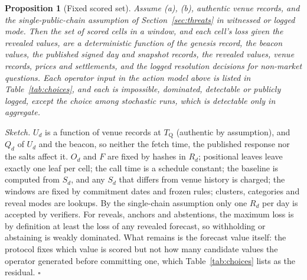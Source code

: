 \documentclass[11pt]{article}
\newtheorem{proposition}{Proposition}
\newcommand{\tQ}{T_{\mathrm{Q}}}
\begin{document}
\begin{proposition}[Fixed scored set]
\label{prop:set}
Assume (a), (b), authentic venue records, and the single-public-chain assumption of Section~\ref{sec:threats} in witnessed or logged mode. Then the set of scored cells in a window, and each cell's loss given the revealed values, are a deterministic function of the genesis record, the beacon values, the published signed day and snapshot records, the revealed values, venue records, prices and settlements, and the logged resolution decisions for non-market questions. Each operator input in the action model above is listed in Table~\ref{tab:choices}, and each is impossible, dominated, detectable or publicly logged, except the choice among stochastic runs, which is detectable only in aggregate.
\end{proposition}

\noindent\emph{Sketch.} $U_d$ is a function of venue records at $\tQ$ (authentic by assumption), and $Q_d$ of $U_d$ and the beacon, so neither the fetch time, the published response nor the salts affect it. $O_d$ and $F$ are fixed by hashes in $R_d$; positional leaves leave exactly one leaf per cell; the call time is a schedule constant; the baseline is computed from $S_d$, and any $S_d$ that differs from venue history is charged; the windows are fixed by commitment dates and frozen rules; clusters, categories and reveal modes are lookups. By the single-chain assumption only one $R_d$ per day is accepted by verifiers. For reveals, anchors and abstentions, the maximum loss is by definition at least the loss of any revealed forecast, so withholding or abstaining is weakly dominated. What remains is the forecast value itself: the protocol fixes which value is scored but not how many candidate values the operator generated before committing one, which Table~\ref{tab:choices} lists as the residual. $\square$
\end{document}
